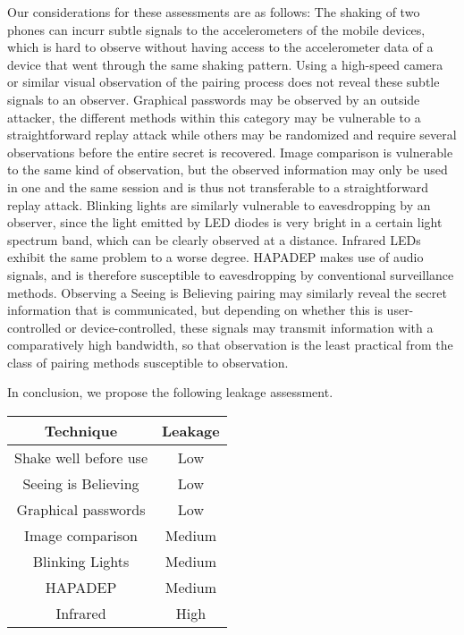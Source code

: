 \documentclass[conference, 11pt]{sty/IEEEtran}
\begin{document}
Our considerations for these assessments are as follows:
The shaking of two phones can incurr subtle signals to the accelerometers of the mobile devices, which is hard to observe without having access to the accelerometer data of a device that went through the same shaking pattern.
Using a high-speed camera or similar visual observation of the pairing process does not reveal these subtle signals to an observer.
Graphical passwords may be observed by an outside attacker, the different methods within this category may be vulnerable to a straightforward replay attack while others may be randomized and require several observations before the entire secret is recovered.
Image comparison is vulnerable to the same kind of observation, but the observed information may only be used in one and the same session and is thus not transferable to a straightforward replay attack.
Blinking lights are similarly vulnerable to eavesdropping by an observer, since the light emitted by LED diodes is very bright in a certain light spectrum band, which can be clearly observed at a distance.
Infrared LEDs exhibit the same problem to a worse degree.
HAPADEP makes use of audio signals, and is therefore susceptible to eavesdropping by conventional surveillance methods.
Observing a Seeing is Believing pairing may similarly reveal the secret information that is communicated, but depending on whether this is user-controlled or device-controlled, these signals may transmit information with a comparatively high bandwidth, so that observation is the least practical from the class of pairing methods susceptible to observation.

In conclusion, we propose the following leakage assessment.

\begin{tabular}{c|c}
	Technique & Leakage \\
	\hline
	Shake well before use & Low \\
	Seeing is Believing & Low \\
	Graphical passwords & Low \\
	Image comparison & Medium \\
     Blinking Lights & Medium \\
     HAPADEP & Medium \\
	Infrared & High \\
\end{tabular}


\end{document}
